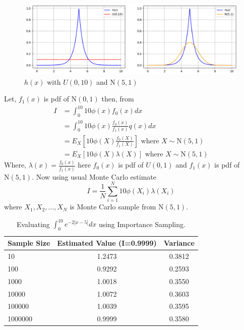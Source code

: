 \begin{example}
\begin{figure}[H]
		\centering
		\includegraphics[width=1\textwidth]{images/importance-sampling/example1/h(x)_with_normal_and_uniform.png}
        \caption{$h(x)$ with $U(0,10)$ and $\text{N}(5,1)$}
		\label{fig:hxwithU01andN01}
	\end{figure}

    Let, $f_1(x)$ is pdf of $\text{N}(0,1)$ then, from 
	\begin{align*}
		I & = \int_{0}^{10} 10\phi(x) f_0(x) dx                                            \\
		  & = \int_{0}^{10} 10 \phi(x) \frac{f_0(x)}{f_1(x)} q(x)dx                          \\
          & = E_X\left[ 10 \phi(X) \frac{f_0(X)}{f_1(X)} \right] \text{ where } X\sim \text{N}(5,1) \\
          & = E_X\left[ 10 \phi(X) \lambda(X) \right]\text{ where } X\sim \text{N}(5,1)
	\end{align*}
    Where, $\lambda(x) = \frac{f_0(x)}{f_1(x)}$ here $f_0(x)$ is pdf of $U(0,1)$ and $f_1(x)$ is pdf of $\text{N}(5,1)$. Now using usual Monte Carlo estimate
	\[
		I = \frac{1}{N} \sum_{i = 1}^{N} 10 \phi(X_i) \lambda(X_i)
	\]
    where $X_1, X_2,\ldots,X_N$ is Monte Carlo sample from $\text{N}(5,1)$.
	\begin{table}[H]
		\centering
		\begin{tabular}{l c c}
			\hline
			Sample Size & Estimated Value (I=0.9999) & Variance \\
			\hline
			10          & 1.2473                     & 0.3812   \\
			100         & 0.9292                     & 0.2593   \\
			1000        & 1.0018                     & 0.3550   \\
			10000       & 1.0072                     & 0.3603   \\
			100000      & 1.0039                     & 0.3595   \\
			1000000     & 0.9999                     & 0.3580   \\
			\hline
		\end{tabular}
		\caption{Evaluating $\int_{0}^{10} e^{-2 |x-5|} dx$ using Importance Sampling.}
		\label{tab:mytable}
	\end{table}
	

\end{example}
